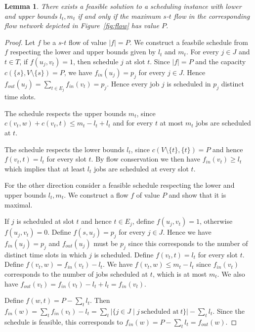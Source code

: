 \documentclass[a4paper]{article}
\newtheorem{lemma}[theorem]{Lemma}
\begin{document}
\begin{lemma}\label{lemma:flow_feasibility}
  There exists a feasible solution to a scheduling instance with lower and upper bounds $l_t, m_t$ if and only if the maximum $s$-$t$ flow in the corresponding flow network depicted in Figure~\ref{fig:flow} has value $P$.
\end{lemma}
\begin{proof}
  Let $f$ be a $s$-$t$ flow of value $|f| = P$.
  We construct a feasbile schedule from $f$ respecting the lower and upper bounds given by $l_t$ and $m_t$.
  For every $j \in J$ and  $t \in T$, if $f(u_j, v_t) = 1$, then schedule $j$ at slot $t$.
  Since $|f| = P$ and the capacity $c(\{s\}, V \setminus \{s\}) = P$, we have $f_{in}(u_j) = p_j$ for every $j \in J$.
  Hence $f_{out}(u_j) = \sum_{t \in E_j} f_{in}(v_t) = p_j$.
  Hence every job $j$ is scheduled in $p_j$ distinct time slots.

  The schedule respects the upper bounds $m_t$, since $c(v_t, w) + c(v_t, t) \leq m_t - l_t + l_t$ and for every $t$ at most $m_t$ jobs are scheduled at $t$.

  The schedule respects the lower bounds $l_t$, since
  $c(V \setminus \{t\}, \{t\}) = P$ and hence
  $f(v_t, t) = l_t$ for every slot $t$.
  By flow conservation we then have $f_{in}(v_t) \geq l_t$ which implies that at least $l_t$ jobs are scheduled at every slot $t$.

  For the other direction consider a feasible schedule respecting the lower and upper bounds $l_t, m_t$.
  We construct a flow $f$ of value $P$ and show that it is maximal.

  If $j$ is scheduled at slot $t$ and hence $t \in E_j$,
  define $f(u_j, v_t) = 1$, otherwise $f(u_j, v_t) = 0$.
  Define $f(s, u_j) = p_j$ for every $j \in J$.
  Hence we have $f_{in}(u_j) = p_j$
  and $f_{out}(u_j)$ must be  $p_j$ since this corresponds to the number of distinct time slots in which $j$ is scheduled.
  Define $f(v_t, t) = l_t$ for every slot $t$.
  Define $f(v_t, w) = f_{in}(v_t) - l_t$.
  We have $f(v_t, w) \leq m_t - l_t$ since $f_{in}(v_t)$ corresponds to the number of jobs scheduled at $t$, which is at most $m_t$.
  We also have $f_{out}(v_t) = f_{in}(v_t) - l_t + l_t = f_{in}(v_t)$.

  Define $f(w, t) = P - \sum_t l_t$.
  Then $f_{in}(w) = \sum_t f_{in}(v_t) - l_t
  = \sum_t |\{j \in J \mid j~\text{scheduled at}~t\}| - \sum_t l_t$.
  Since the schedule is feasible, this corresponds to
  $f_{in}(w) = P - \sum_t l_t = f_{out}(w)$.

\end{proof}
\end{document}
